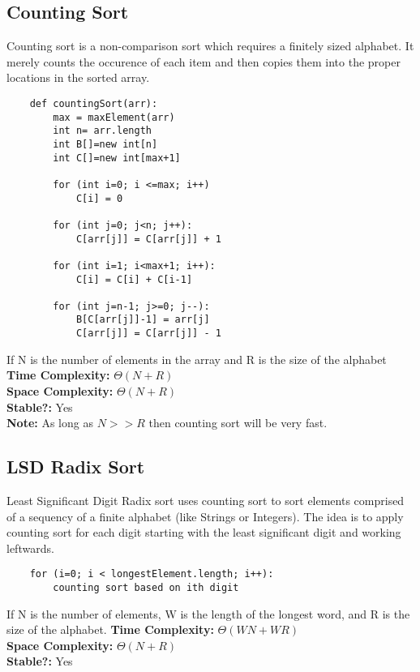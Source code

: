 \documentclass{article}
\begin{document}
\subsection{Counting Sort}
Counting sort is a non-comparison sort which requires a finitely sized alphabet.
It merely counts the occurence of each item and then copies them into the proper locations in the sorted array.
\begin{lstlisting}
    def countingSort(arr):
        max = maxElement(arr)
        int n= arr.length
        int B[]=new int[n]
        int C[]=new int[max+1]

        for (int i=0; i <=max; i++)
            C[i] = 0

        for (int j=0; j<n; j++):
            C[arr[j]] = C[arr[j]] + 1
    
        for (int i=1; i<max+1; i++):
            C[i] = C[i] + C[i-1]

        for (int j=n-1; j>=0; j--):
            B[C[arr[j]]-1] = arr[j]
            C[arr[j]] = C[arr[j]] - 1
\end{lstlisting}
If N is the number of elements in the array and R is the size of the alphabet
\textbf{Time Complexity: } $\Theta(N + R)$\\
\textbf{Space Complexity: } $\Theta(N + R)$\\
\textbf{Stable?: } Yes\\
\textbf{Note: } As long as $N >> R$ then counting sort will be very fast.
\subsection{LSD Radix Sort}
Least Significant Digit Radix sort uses counting sort to sort elements comprised of a sequency of a finite alphabet (like Strings or Integers).
The idea is to apply counting sort for each digit starting with the least significant digit and working leftwards.
\begin{lstlisting}
    for (i=0; i < longestElement.length; i++):
        counting sort based on ith digit
\end{lstlisting}
If N is the number of elements, W is the length of the longest word, and R is the size of the alphabet.
\textbf{Time Complexity: } $\Theta(WN + WR)$\\
\textbf{Space Complexity: } $\Theta(N + R)$\\
\textbf{Stable?: } Yes
\end{document}
